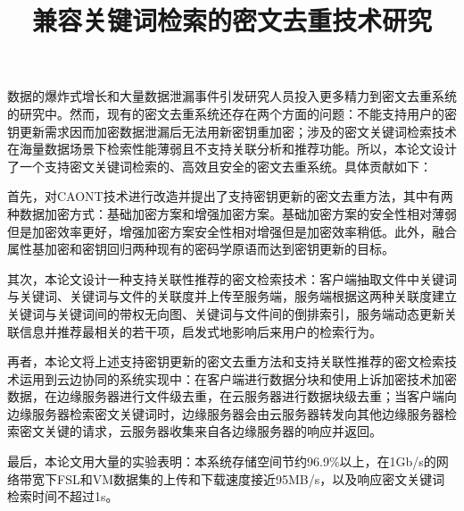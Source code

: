 \documentclass[promaster]{thesis-uestc}
\title{兼容关键词检索的密文去重技术研究}{English Title} %
\author{\quad}{\quad} %
\begin{document}
\makecover %
\originalitydeclaration %
\begin{chineseabstract}
    数据的爆炸式增长和大量数据泄漏事件引发研究人员投入更多精力到密文去重系统的研究中。然而，现有的密文去重系统还存在两个方面的问题：不能支持用户的密钥更新需求因而加密数据泄漏后无法用新密钥重加密；涉及的密文关键词检索技术在海量数据场景下检索性能薄弱且不支持关联分析和推荐功能。所以，本论文设计了一个支持密文关键词检索的、高效且安全的密文去重系统。具体贡献如下：

    首先，对\acrshort{CAONT}技术进行改造并提出了支持密钥更新的密文去重方法，其中有两种数据加密方式：基础加密方案和增强加密方案。基础加密方案的安全性相对薄弱但是加密效率更好，增强加密方案安全性相对增强但是加密效率稍低。此外，融合属性基加密和密钥回归两种现有的密码学原语而达到密钥更新的目标。

    其次，本论文设计一种支持关联性推荐的密文检索技术：客户端抽取文件中关键词与关键词、关键词与文件的关联度并上传至服务端，服务端根据这两种关联度建立关键词与关键词间的带权无向图、关键词与文件间的倒排索引，服务端动态更新关联信息并推荐最相关的若干项，启发式地影响后来用户的检索行为。

    再者，本论文将上述支持密钥更新的密文去重方法和支持关联性推荐的密文检索技术运用到云边协同的系统实现中：在客户端进行数据分块和使用上诉加密技术加密数据，在边缘服务器进行文件级去重，在云服务器进行数据块级去重；当客户端向边缘服务器检索密文关键词时，边缘服务器会由云服务器转发向其他边缘服务器检索密文关键的请求，云服务器收集来自各边缘服务器的响应并返回。

    最后，本论文用大量的实验表明：本系统存储空间节约96.9\%以上，在1Gb/s的网络带宽下FSL和VM数据集的上传和下载速度接近95MB/s，以及响应密文关键词检索时间不超过1s。

\end{chineseabstract}
\end{document}
